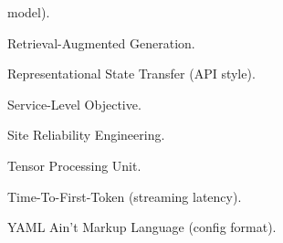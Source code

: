 \begin{description}
                       model).
  \item[RAG]           Retrieval-Augmented Generation.
  \item[REST]          Representational State Transfer (API style).
  \item[SLO]           Service-Level Objective.
  \item[SRE]           Site Reliability Engineering.
  \item[TPU]           Tensor Processing Unit.
  \item[TTFT]          Time-To-First-Token (streaming latency).
  \item[YAML]          YAML Ain't Markup Language (config format).

\end{description}
